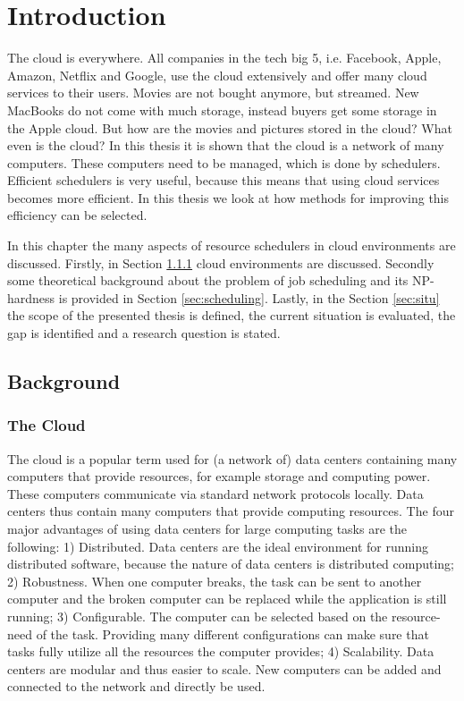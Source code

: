 \chapter{Introduction}\label{sec:intro}

The cloud is everywhere. All companies in the tech big 5, i.e. Facebook,
Apple, Amazon, Netflix and Google, use the cloud extensively and offer many cloud
services to their users. Movies are not bought anymore, but streamed. New
MacBooks do not come with much storage, instead buyers get some storage in the
Apple cloud. But how are the movies and pictures stored in the cloud? What
even is the cloud? In this thesis it is shown that the cloud is a network of
many computers. These computers need to be managed, which is done by
schedulers. Efficient schedulers is very useful, because this means that using
cloud services becomes more efficient. In this thesis we look at how methods
for improving this efficiency can be selected.

In this chapter the many aspects of resource schedulers in cloud environments
are discussed. Firstly, in Section \ref{sec:cloud} cloud environments are
discussed. Secondly some theoretical background about the problem of job
scheduling and its NP-hardness is provided in Section \ref{sec:scheduling}.
Lastly, in the Section \ref{sec:situ} the scope of the presented thesis is
defined, the current situation is evaluated, the gap is identified and a
research question is stated.

\section{Background}
\subsection{The Cloud}\label{sec:cloud}

The cloud is a popular term used for (a network of) data centers containing
many computers that provide resources, for example storage and computing
power. These computers communicate via standard network protocols locally.
Data centers thus contain many computers that provide computing resources. The
four major advantages of using data centers for large computing tasks are the
following: 1) Distributed. Data centers are the ideal environment for running
distributed software, because the nature of data centers is distributed
computing; 2) Robustness. When one computer breaks, the task can be sent to
another computer and the broken computer can be replaced while the application
is still running; 3) Configurable. The computer can be selected based on the
resource-need of the task. Providing many different configurations can make
sure that tasks fully utilize all the resources the computer provides; 4)
Scalability. Data centers are modular and thus easier to scale. New computers
can be added and connected to the network and directly be used.

